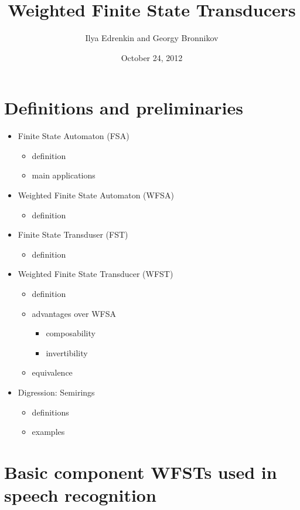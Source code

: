 \documentclass{beamer}
\title{Weighted Finite State Transducers}
\author{Ilya Edrenkin and Georgy Bronnikov}
\date{October 24, 2012}
\newcommand{\<}{\langle}
\renewcommand{\>}{\rangle}
\begin{document}
\maketitle

\section{Definitions and preliminaries}

\begin{frame}
  \begin{itemize}
  \item Finite State Automaton (FSA)
    \begin{itemize}
    \item definition
    \item main applications
    \end{itemize}
  \item Weighted Finite State Automaton (WFSA)
    \begin{itemize}
    \item definition
    \end{itemize}
  \item Finite State Transduser (FST)
    \begin{itemize}
    \item definition
    \end{itemize}
  \item Weighted Finite State Transducer (WFST)
    \begin{itemize}
    \item definition
    \item advantages over WFSA
      \begin{itemize}
      \item composability
      \item invertibility
      \end{itemize}
    \item equivalence
    \end{itemize}
  \item Digression: Semirings
    \begin{itemize}
    \item definitions
    \item examples
    \end{itemize}
  \end{itemize}
\end{frame}

\section{Basic component WFSTs used in speech recognition}
\end{document}
